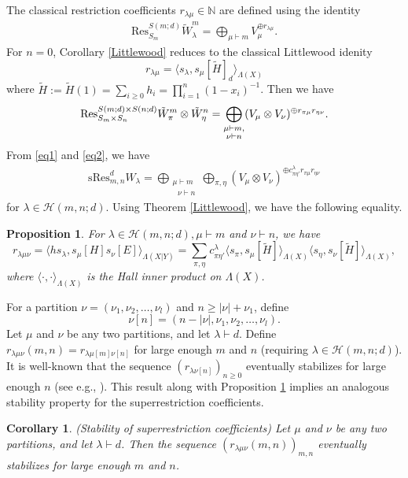 \documentclass[12pt,reqno]{amsart}
\newtheorem{proposition}[theorem]{Proposition}
\newtheorem{corollary}[theorem]{Corollary}
\theoremstyle{definition}
\theoremstyle{remark}
\newcommand{\Hi}{\mathcal{H}(m,n;d)}
\newcommand{\res}{\mathrm{sRes}_{m,n}^{d}}
\begin{document}
The classical restriction coefficients $r_{\lambda\mu}\in\mathbb{N}$ are defined using the identity
\begin{align*}
    \text{Res}^{S(m;d)}_{S_m}\tilde{W}^{m}_{\lambda}=\bigoplus_{\mu\vdash m}V_{\mu}^{\oplus r_{\lambda\mu}}.
\end{align*} 
For $n=0$, Corollary \ref{Littlewood} reduces to the classical Littlewood idenity $$r_{\lambda\mu}=\langle s_{\lambda}, s_{\mu}[\tilde{H}]_{d}\rangle_{\Lambda(X)}$$ where $\tilde{H}:=\tilde{H}(1)=\sum_{i\geq 0}h_{i}=\prod_{i=1}^{n}(1-x_{i})^{-1}$. Then we have 
\begin{align}\label{eq2}
    \text{Res}^{S(m;d)\times S(n;d)}_{S_{m}\times S_{n}} \Tilde{W}^{m}_{\pi}\otimes \Tilde{W}^{n}_{\eta}=\bigoplus_{\substack{\mu\vdash m,\\ \nu\vdash n}} (V_{\mu}\otimes V_{\nu})^{\oplus r_{\pi\mu}r_{\eta\nu}}. 
\end{align}
From \eqref{eq1} and \eqref{eq2}, we have
\begin{align*}
    \res W_{\lambda}=\bigoplus_{\substack{\mu\vdash m\\\text{ }\nu\vdash n}}\bigoplus_{\pi,\eta} (V_{\mu}\otimes V_{\nu})^{\oplus c^{\lambda}_{\pi\eta'}r_{\pi\mu}r_{\eta\nu}}
\end{align*}
for $\lambda\in\mathcal{H}(m,n;d)$. Using Theorem \ref{Littlewood}, we have the following equality.
\begin{proposition}\label{plethysticIdentity}For $\lambda\in\Hi,\mu\vdash m$ and $\nu\vdash n$, we have
    $$r_{\lambda\mu\nu}=\langle hs_{\lambda},s_{\mu}[H]s_{\nu}[E]\rangle_{\Lambda(X|Y)}
    =\sum_{\pi,\eta}c^{\lambda}_{\pi\eta'}{\langle s_{\pi}, s_{\mu}[\tilde{H}]\rangle_{\Lambda(X)}}{\langle s_{\eta}, s_{\nu}[\tilde{H}]}\rangle_{\Lambda(X)},$$ where $\langle\cdot,\cdot\rangle_{\Lambda(X)}$ is the Hall inner product on $\Lambda(X)$.
\end{proposition}
For a partition $\nu=(\nu_{1},\nu_{2},\dotsc,\nu_{l})$ and $n\geq |\nu|+\nu_{1}$, define
$$\nu[n]=(n-|\nu|,\nu_{1},\nu_{2},\dotsc,\nu_{l}).$$ Let $\mu$ and $\nu$ be any two partitions, and let $\lambda\vdash d$. Define $r_{\lambda\mu\nu}(m,n)=r_{\lambda\mu[m]\nu[n]}$ for large enough $m$ and $n$ (requiring $\lambda\in\Hi$). It is well-known that the sequence $(r_{\lambda\nu[n]})_{n\geq 0}$ eventually stabilizes for large enough $n$ (see e.g., \cite{littlewood1977theory,assaf2020specht,narayanan2021character}). This result along with Proposition \ref{plethysticIdentity} implies an analogous stability property for the superrestriction coefficients.
\begin{corollary}{\em(Stability of superrestriction coefficients)} Let $\mu$ and $\nu$ be any two partitions, and let $\lambda\vdash d$. Then the sequence $(r_{\lambda\mu\nu}(m,n))_{m,n}$ eventually stabilizes for large enough $m$ and $n$.
\end{corollary}
\end{document}

